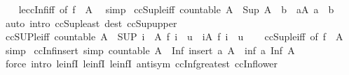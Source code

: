 \begin{isabellebody}
%
\isadelimproof
\ \ %
\endisadelimproof
%
\isatagproof
{}\isamarkupfalse%
\ le{\isacharunderscore}ccInf{\isacharunderscore}iff\ {\isacharbrackleft}of\ {\isachardoublequoteopen}f\ {\isacharbackquote}\ A{\isachardoublequoteclose}{\isacharbrackright}\ \isamarkupfalse%
\ simp%
\endisatagproof
{\isafoldproof}%
%
\isadelimproof
\isanewline
%
\endisadelimproof
\isanewline
{}\isamarkupfalse%
\ ccSup{\isacharunderscore}le{\isacharunderscore}iff{\isacharcolon}\ {\isachardoublequoteopen}countable\ A\ {\isasymLongrightarrow}\ Sup\ A\ {\isasymle}\ b\ {\isasymlongleftrightarrow}\ {\isacharparenleft}{\isasymforall}a{\isasymin}A{\isachardot}\ a\ {\isasymle}\ b{\isacharparenright}{\isachardoublequoteclose}\isanewline
%
\isadelimproof
\ \ %
\endisadelimproof
%
\isatagproof
{}\isamarkupfalse%
\ {\isacharparenleft}auto\ intro{\isacharcolon}\ ccSup{\isacharunderscore}least\ dest{\isacharcolon}\ ccSup{\isacharunderscore}upper{\isacharparenright}%
\endisatagproof
{\isafoldproof}%
%
\isadelimproof
\isanewline
%
\endisadelimproof
\isanewline
{}\isamarkupfalse%
\ ccSUP{\isacharunderscore}le{\isacharunderscore}iff{\isacharcolon}\ {\isachardoublequoteopen}countable\ A\ {\isasymLongrightarrow}\ {\isacharparenleft}SUP\ i\ {\isasymin}\ A{\isachardot}\ f\ i{\isacharparenright}\ {\isasymle}\ u\ {\isasymlongleftrightarrow}\ {\isacharparenleft}{\isasymforall}i{\isasymin}A{\isachardot}\ f\ i\ {\isasymle}\ u{\isacharparenright}{\isachardoublequoteclose}\isanewline
%
\isadelimproof
\ \ %
\endisadelimproof
%
\isatagproof
{}\isamarkupfalse%
\ ccSup{\isacharunderscore}le{\isacharunderscore}iff\ {\isacharbrackleft}of\ {\isachardoublequoteopen}f\ {\isacharbackquote}\ A{\isachardoublequoteclose}{\isacharbrackright}\ \isamarkupfalse%
\ simp%
\endisatagproof
{\isafoldproof}%
%
\isadelimproof
\isanewline
%
\endisadelimproof
\isanewline
{}\isamarkupfalse%
\ ccInf{\isacharunderscore}insert\ {\isacharbrackleft}simp{\isacharbrackright}{\isacharcolon}\ {\isachardoublequoteopen}countable\ A\ {\isasymLongrightarrow}\ Inf\ {\isacharparenleft}insert\ a\ A{\isacharparenright}\ {\isacharequal}\ inf\ a\ {\isacharparenleft}Inf\ A{\isacharparenright}{\isachardoublequoteclose}\isanewline
%
\isadelimproof
\ \ %
\endisadelimproof
%
\isatagproof
{}\isamarkupfalse%
\ {\isacharparenleft}force\ intro{\isacharcolon}\ le{\isacharunderscore}infI\ le{\isacharunderscore}infI{}\ le{\isacharunderscore}infI{}\ antisym\ ccInf{\isacharunderscore}greatest\ ccInf{\isacharunderscore}lower{\isacharparenright}%

\end{isabellebody}
